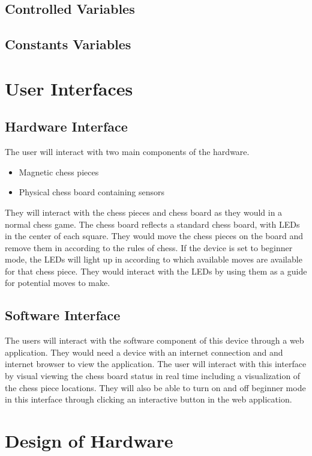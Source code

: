 \documentclass[12pt, titlepage]{article}
\begin{document}
\subsection{Controlled Variables}

\subsection{Constants Variables}

\section{User Interfaces}

\subsection*{Hardware Interface}
The user will interact with two main components of the hardware.
\begin{itemize}
  \item Magnetic chess pieces
  \item Physical chess board containing sensors
\end{itemize}
They will interact with the chess pieces and chess board as they would in a normal chess game. The chess board reflects a standard chess board, with 
LEDs in the center of each square. They would move the chess pieces on the board and remove them in according to the rules of chess. If the device
is set to beginner mode, the LEDs will light up in according to which available moves are available for that chess piece. They would interact with the LEDs
by using them as a guide for potential moves to make.

\subsection*{Software Interface}
The users will interact with the software component of this device through a web application. They would need a device with an internet connection and and internet browser
to view the application. The user will interact with this interface by visual viewing the chess board status in real time including a visualization of the chess piece locations.
They will also be able to turn on and off beginner mode in this interface through clicking an interactive button in the web application. 

\section{Design of Hardware}
\end{document}
